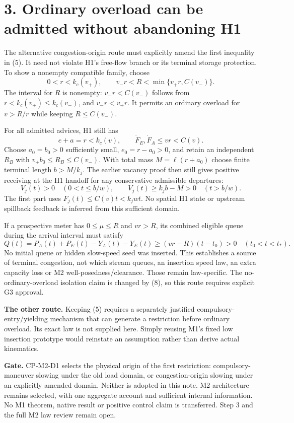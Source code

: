\documentclass[11pt,a4paper]{article}
\begin{document}
\newpage
\section*{3. Ordinary overload can be admitted without abandoning H1}

The alternative congestion-origin route must explicitly amend the first
inequality in (5). It need not violate H1's free-flow branch or its terminal
storage protection. To show a nonempty compatible family, choose
\begin{equation}
 0<r<k_c(v_+),\qquad
 v_-r<R<\min\{v_+r,C(v_-)\}.
 \tag{8}
\end{equation}
The interval for $R$ is nonempty: $v_-r<C(v_-)$ follows from
$r<k_c(v_+)\leq k_c(v_-)$, and $v_-r<v_+r$. It permits an ordinary
overload for $v>R/r$ while keeping $R\leq C(v_-)$.

For all admitted advices, H1 still has
\begin{equation}
 e+a=r<k_c(v),\qquad
 \dot F_E,\dot F_A\leq vr<C(v).
 \tag{9}
\end{equation}
Choose $a_0=b_0>0$ sufficiently small, $e_0=r-a_0>0$, and retain
an independent $R_B$ with $v_+b_0\leq R_B\leq C(v_-)$. With total
mass $M=\ell(r+a_0)$ choose finite terminal length $b>M/k_j$.
The earlier vacancy proof then still gives positive receiving at the H1
handoff for any conservative admissible departures:
\begin{equation}
 V_j(t)>0\quad(0<t\leq b/w),\qquad
 V_j(t)\geq k_jb-M>0\quad(t>b/w).
 \tag{10}
\end{equation}
The first part uses $F_j(t)\leq C(v)t<k_jwt$. No spatial H1 state or
upstream spillback feedback is inferred from this sufficient domain.

If a prospective meter has $0\leq\mu\leq R$ and $vr>R$, its combined
eligible queue during the arrival interval must satisfy
\begin{equation}
 Q(t)=P_A(t)+P_E(t)-Y_A(t)-Y_E(t)
 \geq(vr-R)(t-t_0)>0\quad(t_0<t<t_*).
 \tag{11}
\end{equation}
No initial queue or hidden slow-speed seed was inserted. This establishes
a source of terminal congestion, not which stream queues, an insertion
speed law, an extra capacity loss or M2 well-posedness/clearance. Those remain
law-specific. The no-ordinary-overload isolation claim is changed by (8), so
this route requires explicit G3 approval.

\textbf{The other route.} Keeping (5) requires a separately justified
compulsory-entry/yielding mechanism that can generate a restriction before
ordinary overload. Its exact law is not supplied here. Simply reusing M1's
fixed low insertion prototype would reinstate an assumption rather than
derive actual kinematics.

\textbf{Gate.} CP-M2-D1 selects the physical origin of the first restriction:
compulsory-maneuver slowing under the old load domain, or congestion-origin
slowing under an explicitly amended domain. Neither is adopted in this note.
M2 architecture remains selected, with one aggregate account and sufficient
internal information. No M1 theorem, native result or positive control claim
is transferred. Step 3 and the full M2 law review remain open.
\end{document}
